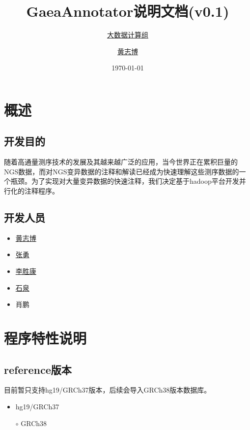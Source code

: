 \documentclass[UTF8,10pt,a4paper]{ctexart}
\title{GaeaAnnotator说明文档{\small (v0.1)}}
\author{\href{http://bigdata.genomics.cn/}{大数据计算组} \and
\href{mailto:huangzhibo@genomics.cn}{黄志博}}
\date{\today}
\begin{document}
\maketitle
\vspace{3em}
\tableofcontents\thispagestyle{empty}
\newpage
\setlength{\parskip}{1ex plus 0.5ex minus 0.2ex}



\section{概述}
\subsection{开发目的}
随着高通量测序技术的发展及其越来越广泛的应用，当今世界正在累积巨量的NGS数据，而对NGS变异数据的注释和解读已经成为快速理解这些测序数据的一个瓶颈。为了实现对大量变异数据的快速注释，我们决定基于hadoop平台开发并行化的注释程序。

\subsection{开发人员}
\begin{multicols}{5}
\begin{itemize}
\item \href{mailto:huangzhibo@genomics.cn} {黄志博 }
\item  \href{mailto:zhangyong2@genomics.cn}{张勇}
\item \href{mailto:lishengkang@genomics.cn}{李胜康}
\item \href{mailto:shiquan@genomics.cn}{石泉}
\item 肖鹏
\end{itemize}
\end{multicols}

\section{程序特性说明}
\subsection{reference版本}
目前暂只支持hg19/GRCh37版本，后续会导入GRCh38版本数据库。
\begin{itemize}
	\item hg19/GRCh37
        \item[$\circ$] GRCh38
\end{itemize}
\end{document}
